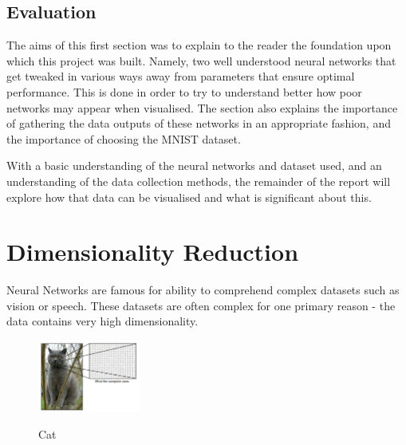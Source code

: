 \documentclass[a4paper,11pt,titlepage]{article}
\begin{document}
\subsection{Evaluation}
The aims of this first section was to explain to the reader the foundation upon which this project was built. Namely, two well understood neural networks that get tweaked in various ways away from parameters that ensure optimal performance. This is done in order to try to understand better how poor networks may appear when visualised. The section also explains the importance of gathering the data outputs of these networks in an appropriate fashion, and the importance of choosing the MNIST dataset. 
	\par 
	With a basic understanding of the neural networks and dataset used, and an understanding of the data collection methods, the remainder of the report will explore how that data can be visualised and what is significant about this.

\clearpage
	
\section{Dimensionality Reduction}

Neural Networks are famous for ability to comprehend complex datasets such as vision or speech. These datasets are often complex for one primary reason - the data contains very high dimensionality.

 	\begin{figure}[H]
    			\centering	
			{{\includegraphics[width=0.3\textwidth]
    				{img/catimage.png} 
    			}}%
    			\caption{Cat}%
    		\label{fig:lascaux}
	\end{figure}
	
\end{document}
